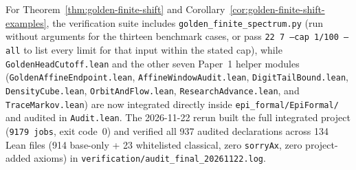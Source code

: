 \documentclass[11pt]{amsart}
\theoremstyle{definition}
\theoremstyle{remark}
\numberwithin{equation}{section}
\begin{document}
For Theorem~\ref{thm:golden-finite-shift} and
Corollary~\ref{cor:golden-finite-shift-examples}, the verification suite
includes \texttt{golden\_\allowbreak finite\_\allowbreak spectrum.py}
(run without arguments for the thirteen benchmark cases, or pass
\texttt{22 7 --cap 1/100 --all} to list every limit for that input
within the stated cap), while \texttt{GoldenHeadCutoff.lean} and the
other seven Paper~1 helper modules (\texttt{GoldenAffineEndpoint.lean},
\texttt{AffineWindowAudit.lean}, \texttt{DigitTailBound.lean},
\texttt{DensityCube.lean}, \texttt{OrbitAndFlow.lean},
\texttt{ResearchAdvance.lean}, and \texttt{TraceMarkov.lean}) are now
integrated directly inside \texttt{epi\_formal/\allowbreak EpiFormal/}
and audited in \texttt{Audit.lean}. The 2026-11-22 rerun built the full
integrated project (\texttt{9179 jobs}, exit code~0) and verified all
937 audited declarations across 134 Lean files (914 base-only + 23 whitelisted classical,
zero \texttt{sorryAx}, zero project-added axioms) in
\texttt{verification/\allowbreak audit\_\allowbreak final\_\allowbreak 20261122.log}.
\end{document}
